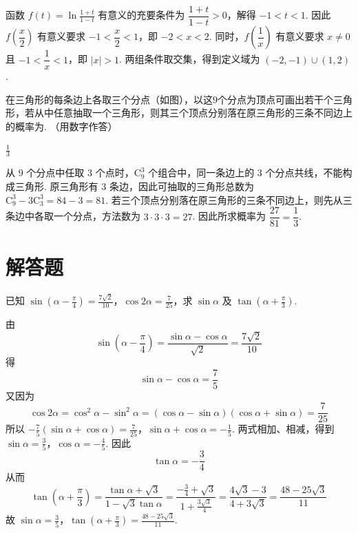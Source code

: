 \begin{solution}
函数 \(f(t)=\ln\frac{1+t}{1-t}\) 有意义的充要条件为
\(\dfrac{1+t}{1-t}>0\)，解得 \(-1<t<1\). 因此 \(f\left(\dfrac{x}{2}\right)\) 有意义要求 \(-1<\dfrac{x}{2}<1\)，即 \(-2<x<2\). 同时，\(f\left(\dfrac{1}{x}\right)\) 有意义要求 \(x\ne0\) 且 \(-1<\dfrac{1}{x}<1\)，即 \(|x|>1\). 两组条件取交集，得到定义域为 \((-2,-1)\cup(1,2)\).
\end{solution}

\begin{problem}
在三角形的每条边上各取三个分点（如图），以这\(9\)个分点为顶点可画出若干个三角形，若从中任意抽取一个三角形，则其三个顶点分别落在原三角形的三条不同边上的概率为\fillinblank{}. （用数字作答）

\end{problem}

\begin{answer}
\(\frac{1}{3}\)
\end{answer}

\begin{solution}
从 \(9\) 个分点中任取 \(3\) 个点时，\(\mathrm C_9^3\) 个组合中，同一条边上的 \(3\) 个分点共线，不能构成三角形. 原三角形有 \(3\) 条边，因此可抽取的三角形总数为
\(\mathrm C_9^3-3\mathrm C_3^3=84-3=81\).
若三个顶点分别落在原三角形的三条不同边上，则先从三条边中各取一个分点，方法数为
\(3\cdot3\cdot3=27\).
因此所求概率为
\(\dfrac{27}{81}=\dfrac{1}{3}\).
\end{solution}

\section{解答题}
\begin{problem}
已知 \(\sin \left( \alpha - \frac{\pi}{4} \right) = \frac{7\sqrt{2}}{10}\)，\(\cos 2\alpha = \frac{7}{25}\)，求 \(\sin \alpha\) 及 \(\tan \left( \alpha + \frac{\pi}{3} \right)\).
\end{problem}

\begin{solution}
由
\[
\sin\left(\alpha-\frac{\pi}{4}\right)
=\frac{\sin\alpha-\cos\alpha}{\sqrt{2}}
=\frac{7\sqrt{2}}{10}
\]
得
\[
\sin\alpha-\cos\alpha=\frac{7}{5}
\]
又因为
\[
\cos2\alpha=\cos^2\alpha-\sin^2\alpha
=(\cos\alpha-\sin\alpha)(\cos\alpha+\sin\alpha)
=\frac{7}{25}
\]
所以
\(-\frac{7}{5}(\sin\alpha+\cos\alpha)=\frac{7}{25}\)，\(\sin\alpha+\cos\alpha=-\frac{1}{5}\).
两式相加、相减，得到
\(\sin\alpha=\frac{3}{5}\)，\(\cos\alpha=-\frac{4}{5}\).
因此
\[
\tan\alpha=-\frac{3}{4}
\]
从而
\[
\tan\left(\alpha+\frac{\pi}{3}\right)
=\frac{\tan\alpha+\sqrt{3}}{1-\sqrt{3}\tan\alpha}
=\frac{-\frac34+\sqrt{3}}{1+\frac{3\sqrt{3}}4}
=\frac{4\sqrt{3}-3}{4+3\sqrt{3}}
=\frac{48-25\sqrt{3}}{11}
\]
故
\(\sin\alpha=\frac35\)，\(\tan\left(\alpha+\frac{\pi}{3}\right)=\frac{48-25\sqrt{3}}{11}\).
\end{solution}


